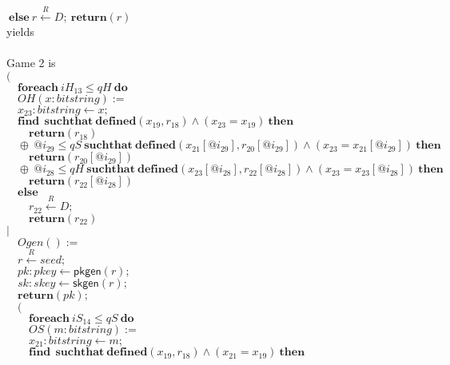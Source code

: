 \documentclass{article}
\newcommand{\store}{\leftarrow}
\newcommand{\getR}{\stackrel{R}{\store}}
\newcommand{\kw}[1]{\mathbf{#1}}
\newcommand{\kwf}[1]{\mathsf{#1}}
\newcommand{\var}[1]{\mathit{#1}}
\newcommand{\kwt}[1]{\mathit{#1}}
\newcommand{\kwp}[1]{\mathit{#1}}
\begin{document}
\begin{tabbing}
$\ \kw{else}\ \var{r} \getR \kwt{D};\ \kw{return}(\var{r})$\\
 yields\\
\\
Game 2 is\\
$($\\
$\quad \kw{foreach}\ \var{iH}_{13} \leq \kwp{qH}\ \kw{do}$\\
$\quad OH(\var{x}: \kwt{bitstring}) :=$\\
$\quad \var{x}_{23}: \kwt{bitstring} \store \var{x};$\\
$\quad \kw{find}\ \ \kw{suchthat}\ \kw{defined}(\var{x}_{19}, \var{r}_{18})\wedge (\var{x}_{23}  =  \var{x}_{19})\ \kw{then}$\\
$\quad \quad \kw{return}\kwf{}(\var{r}_{18})$\\
$\quad \oplus\ \var{@i}_{29} \leq \kwp{qS}\ \kw{suchthat}\ \kw{defined}(\var{x}_{21}[\var{@i}_{29}], \var{r}_{20}[\var{@i}_{29}])\wedge (\var{x}_{23}  =  \var{x}_{21}[\var{@i}_{29}])\ \kw{then}$\\
$\quad \quad \kw{return}\kwf{}(\var{r}_{20}[\var{@i}_{29}])$\\
$\quad \oplus\ \var{@i}_{28} \leq \kwp{qH}\ \kw{suchthat}\ \kw{defined}(\var{x}_{23}[\var{@i}_{28}], \var{r}_{22}[\var{@i}_{28}])\wedge (\var{x}_{23}  =  \var{x}_{23}[\var{@i}_{28}])\ \kw{then}$\\
$\quad \quad \kw{return}\kwf{}(\var{r}_{22}[\var{@i}_{28}])$\\
$\quad \kw{else}$\\
$\quad \quad \var{r}_{22} \getR \kwt{D};$\\
$\quad \quad \kw{return}\kwf{}(\var{r}_{22})$\\
$|$\\
$\quad Ogen() :=$\\
$\quad \var{r} \getR \kwt{seed};$\\
$\quad \var{pk}: \kwt{pkey} \store \kwf{pkgen}(\var{r});$\\
$\quad \var{sk}: \kwt{skey} \store \kwf{skgen}(\var{r});$\\
$\quad \kw{return}\kwf{}(\var{pk});$\\
$\quad ($\\
$\quad \quad \kw{foreach}\ \var{iS}_{14} \leq \kwp{qS}\ \kw{do}$\\
$\quad \quad OS(\var{m}: \kwt{bitstring}) :=$\\
$\quad \quad \var{x}_{21}: \kwt{bitstring} \store \var{m};$\\
$\quad \quad \kw{find}\ \ \kw{suchthat}\ \kw{defined}(\var{x}_{19}, \var{r}_{18})\wedge (\var{x}_{21}  =  \var{x}_{19})\ \kw{then}$\\

\end{tabbing}
\end{document}
